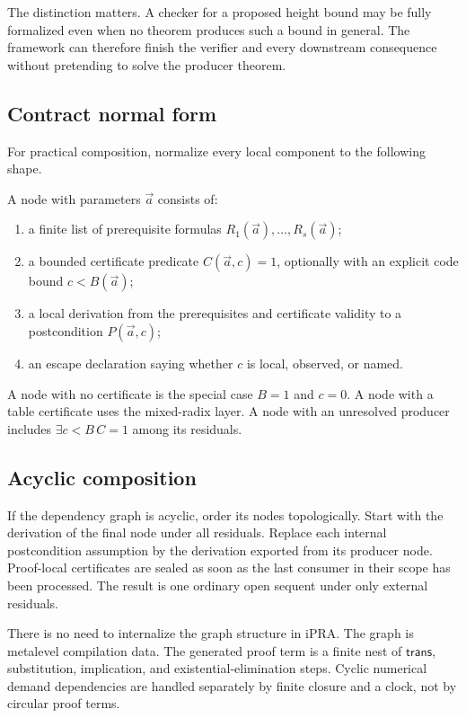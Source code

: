 The distinction matters.  A checker for a proposed height bound may be fully
formalized even when no theorem produces such a bound in general.  The
framework can therefore finish the verifier and every downstream consequence
without pretending to solve the producer theorem.

\subsection{Contract normal form}

For practical composition, normalize every local component to the following
shape.

\begin{contract}
A node with parameters \(\vec a\) consists of:
\begin{enumerate}
\item a finite list of prerequisite formulas \(R_1(\vec a),\ldots,R_s(\vec a)\);
\item a bounded certificate predicate \(C(\vec a,c)=1\), optionally with an
explicit code bound \(c<B(\vec a)\);
\item a local derivation from the prerequisites and certificate validity to a
postcondition \(P(\vec a,c)\);
\item an escape declaration saying whether \(c\) is local, observed, or named.
\end{enumerate}
\end{contract}

A node with no certificate is the special case \(B=1\) and \(c=0\).  A node
with a table certificate uses the mixed-radix layer.  A node with an unresolved
producer includes \(\exists c<B\,C=1\) among its residuals.

\subsection{Acyclic composition}

If the dependency graph is acyclic, order its nodes topologically.  Start with
the derivation of the final node under all residuals.  Replace each internal
postcondition assumption by the derivation exported from its producer node.
Proof-local certificates are sealed as soon as the last consumer in their
scope has been processed.  The result is one ordinary open sequent under only
external residuals.

There is no need to internalize the graph structure in iPRA.  The graph is
metalevel compilation data.  The generated proof term is a finite nest of
\(\mathsf{trans}\), substitution, implication, and existential-elimination
steps.  Cyclic numerical demand dependencies are handled separately by finite
closure and a clock, not by circular proof terms.

